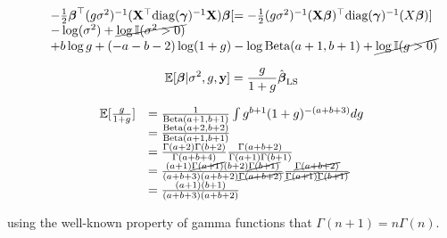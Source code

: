 \documentclass{amsart}[12pt]
\begin{document}
\begin{equation*}
\begin{array}{ll}
		                      & \quad		-\tfrac{1}{2} {\boldsymbol \beta}^\top (g \sigma^2)^{-1} ({\bf X}^\top \text{diag}({\boldsymbol \gamma})^{-1} {\bf X}) {\boldsymbol \beta} [= -\tfrac{1}{2} (g \sigma^2)^{-1} ({\bf X} {\boldsymbol \beta})^\top \text{diag}({\boldsymbol \gamma})^{-1} (X {\boldsymbol \beta})] \\
		                      & \quad - \log(\sigma^2) + \cancel{\log {\mathbb I}(\sigma^2 > 0)}                                                                                                                        \\
		                      & \quad + b \log g + (-a - b - 2) \log(1 + g) - \log \text{Beta}(a + 1,  b + 1) + \cancel{\log {\mathbb I}(g > 0)}                                                                        
	\end{array}
\end{equation*}

\[
	\mathbb{E}[{\boldsymbol \beta} | \sigma^2, g, {\bf y}] = \frac{g}{1 + g} \hat{{\boldsymbol \beta}}_{\text{LS}}
\]

\begin{equation*}
	\begin{array}{rl}
		\mathbb{E}[\frac{g}{1 + g}] & = \frac{1}{\text{Beta}(a +1, b + 1)} \int g^{b+1} (1 + g)^{-(a + b + 3)} dg                                                                                                                                        \\
		                    & = \frac{\text{Beta}(a + 2, b + 2)}{\text{Beta}(a + 1, b + 1)}                                                                                                                                                            \\
		                    & = \frac{\Gamma(a + 2) \Gamma(b + 2)}{\Gamma(a + b + 4)} \frac{\Gamma(a + b + 2)}{\Gamma(a + 1) \Gamma(b + 1)}                                                                                                \\
		                    & =  \frac{(a + 1) \cancel{\Gamma(a + 1)} (b + 2) \cancel{\Gamma(b + 1)}}{(a + b + 3) (a + b + 2) \cancel{\Gamma(a + b + 2)}} \frac{\cancel{\Gamma(a + b + 2)}}{\cancel{\Gamma(a + 1)} \cancel{\Gamma(b + 1)}} \\
		                    & = \frac{(a + 1) (b + 1)}{(a + b + 3) (a + b + 2)}                                                                                                                                                            
	\end{array}
\end{equation*}

using the well-known property of gamma functions that $\Gamma(n + 1) = n \Gamma(n)$.
\end{document}
